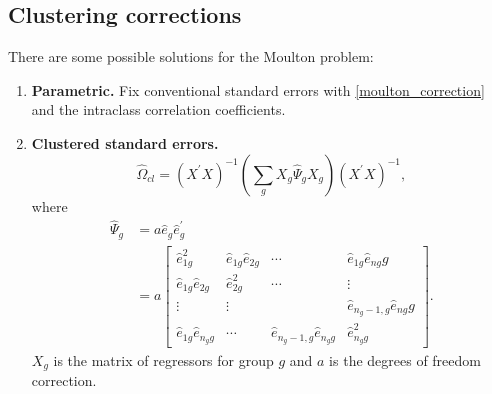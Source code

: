 \documentclass[11pt, a4paper]{report}
\theoremstyle{plain}
\theoremstyle{plain}
\theoremstyle{remark}
\begin{document}
\subsection{Clustering corrections}

There are some possible solutions for the Moulton problem:
\begin{enumerate}
    \item \textbf{Parametric.} Fix conventional standard errors with \ref{moulton_correction} and the intraclass correlation coefficients.
    \item \textbf{Clustered standard errors.}
    \begin{equation}
        \hat{\Omega}_{c l}=\left(X^{\prime} X\right)^{-1}\left(\sum_{g} X_{g} \hat{\Psi}_{g} X_{g}\right)\left(X^{\prime} X\right)^{-1}, 
        \end{equation}
     where
     \begin{equation}
            \begin{aligned}
            \hat{\Psi}_{g} &=a \hat{e}_{g} \hat{e}_{g}^{\prime} \\
            &=a\left[\begin{array}{cccc}
            \hat{e}_{1 g}^{2} & \hat{e}_{1 g} \hat{e}_{2 g} & \cdots & \hat{e}_{1 g} \hat{e}_{n g} g \\
            \hat{e}_{1 g} \hat{e}_{2 g} & \hat{e}_{2 g}^{2} & \cdots & \vdots \\
            \vdots & \vdots & & \hat{e}_{n_{g}-1, g} \hat{e}_{n g} g \\
            \hat{e}_{1 g} \hat{e}_{n_{g} g} & \cdots & \hat{e}_{n_{g}-1, g} \hat{e}_{n_{g} g} & \hat{e}_{n_{g} g}^{2}
            \end{array}\right] .
            \end{aligned}
            \end{equation} 
    $X_g$ is the matrix of regressors for group $g$ and $a$ is the degrees of freedom correction.


\end{enumerate}
\end{document}
